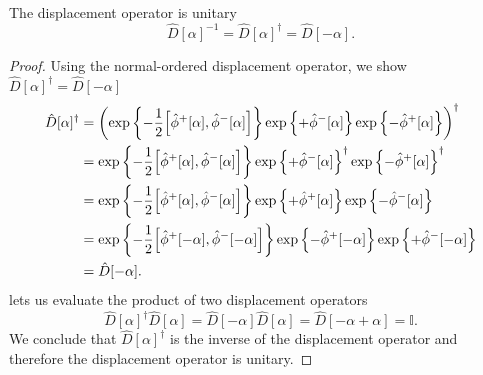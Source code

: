 \begin{lemma}\label{thm:qkg_displacement_unitary}
	The displacement operator is unitary
	\begin{equation}
		\hat{D}[\alpha]^{-1}
		=
		\hat{D}[\alpha]^\dagger
		=
		\hat{D}[-\alpha]
		.
	\end{equation}
\end{lemma}
\begin{proof}
	Using the normal-ordered displacement operator, we show $\hat{D}[\alpha]^\dagger=\hat{D}[-\alpha]$
	\begin{equation*}
		\begin{split}
			\hat{D}[\alpha]^\dagger
			&=
			\left(
				\exp\left\{
					-
					\frac{1}{2}
					\comm{\hat\phi^+[\alpha]}{\hat\phi^-[\alpha]}
				\right\}
				\exp\left\{
					+
					\hat\phi^-[\alpha]
				\right\}
				\exp\left\{
					-
					\hat\phi^+[\alpha]
				\right\}
			\right)^\dagger
			\\
			&=
			\exp\left\{
				-
				\frac{1}{2}
				\comm{\hat\phi^+[\alpha]}{\hat\phi^-[\alpha]}
			\right\}
			\exp\left\{
				+
				\hat\phi^-[\alpha]
			\right\}^\dagger
			\exp\left\{
				-
				\hat\phi^+[\alpha]
			\right\}^\dagger
			\\
			&=
			\exp\left\{
				-
				\frac{1}{2}
				\comm{\hat\phi^+[\alpha]}{\hat\phi^-[\alpha]}
			\right\}
			\exp\left\{
				+
				\hat\phi^+[\alpha]
			\right\}
			\exp\left\{
				-
				\hat\phi^-[\alpha]
			\right\}
			\\
			&=
			\exp\left\{
				-
				\frac{1}{2}
				\comm{\hat\phi^+[-\alpha]}{\hat\phi^-[-\alpha]}
			\right\}
			\exp\left\{
				-
				\hat\phi^+[-\alpha]
			\right\}
			\exp\left\{
				+
				\hat\phi^-[-\alpha]
			\right\}
			\\
			&=
			\hat{D}[-\alpha]
			.
		\end{split}
	\end{equation*}
	 lets us evaluate the product of two displacement operators
	\begin{equation*}
		\hat{D}[\alpha]^\dagger
		\hat{D}[\alpha]
		=
		\hat{D}[-\alpha]
		\hat{D}[\alpha]
		=
		\hat{D}[-\alpha+\alpha]
		=
		\mathbb{I}
		.
	\end{equation*}
	We conclude that $\hat{D}[\alpha]^\dagger$ is the inverse of the displacement operator and therefore the displacement operator is unitary.
\end{proof}

